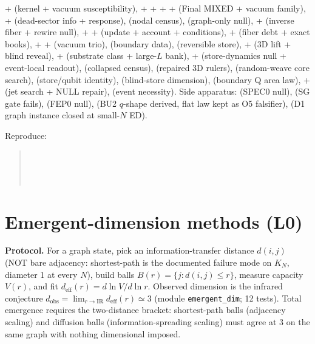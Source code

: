 \documentclass[11pt]{article}
\begin{document}
{ +  (kernel + vacuum susceptibility),
 +  +  +  +
 (Final MIXED + vacuum family),  +
 (dead-sector info + response),  (nodal census),
 (graph-only null),  +  (inverse
fiber + rewire null),  +  + 
(update + account + conditions),  +  (fiber debt
+ exact books),  +  + 
(vacuum trio),  (boundary data),  (reversible
store),  +  (3D lift + blind reveal),
 +  (substrate class + large-$L$ bank),
 +  (store-dynamics null + event-local readout),
 (collapsed census),  (repaired 3D rulers),
 (random-weave core search),  (store/qubit
identity),  (blind-store dimension), 
(boundary Q area law),  +  (jet search + NULL
repair),  (event necessity). Side apparatus: 
(SPEC0 null),  (SG gate fails),  (FEP0
null),  (BU2 $q$-shape derived, flat law kept as O5
falsifier),  (D1 graph instance closed at small-$N$ ED).
\par}

Reproduce:
\begin{quote}\small
{}\\
\\
\\
\end{quote}

\section{Emergent-dimension methods (L0)}
\label{sec:emergent}

\textbf{Protocol.} For a graph state, pick an information-transfer distance
$d(i,j)$ (NOT bare adjacency: shortest-path is the documented failure mode on
$K_N$, diameter 1 at every $N$), build balls $B(r) = \{j : d(i,j) \le r\}$,
measure capacity $V(r)$, and fit $d_{\mathrm{eff}}(r) = d\ln V/d\ln r$.
Observed dimension is the infrared conjecture $d_{\mathrm{obs}} =
\lim_{r\to\mathrm{IR}} d_{\mathrm{eff}}(r) \simeq 3$ (module
\texttt{emergent\_dim}; 12 tests). Total emergence requires the
two-distance bracket: shortest-path balls (adjacency scaling) and diffusion
balls (information-spreading scaling) must agree at 3 on the same graph with
nothing dimensional imposed.
\end{document}
